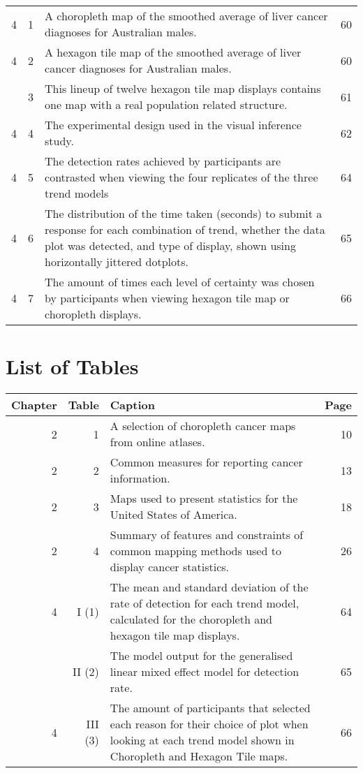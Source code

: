 \documentclass{monashthesis}
\begin{document}
\begin{tabular}{rr>{\raggedright\arraybackslash}p{20em}r}
4 & 1 & A choropleth map of the smoothed average of liver cancer diagnoses for Australian males. & 60\\
4 & 2 & A hexagon tile map of the smoothed average of liver cancer diagnoses for Australian males. & 60\\
\addlinespace
4 & 3 & This lineup of twelve hexagon tile map displays contains one map with a real population related structure. & 61\\
4 & 4 & The experimental design used in the visual inference study. & 62\\
4 & 5 & The detection rates achieved by participants are contrasted when viewing the four replicates of the three trend models & 64\\
4 & 6 & The distribution of the time taken (seconds) to submit a response for each combination of trend, whether the data plot was detected, and type of display, shown using horizontally jittered dotplots. & 65\\
4 & 7 & The amount of times each level of certainty was chosen by participants when viewing hexagon tile map or choropleth displays. & 66\\
\bottomrule
\end{tabular}

\hypertarget{list-of-tables}{%
\chapter*{List of Tables}\label{list-of-tables}}

\begin{tabular}{rr>{\raggedright\arraybackslash}p{20em}r}
\toprule
Chapter & Table & Caption & Page\\
\midrule
2 & 1 & A selection of choropleth cancer maps from online atlases. & 10\\
2 & 2 & Common measures for reporting cancer information. & 13\\
2 & 3 & Maps used to present statistics for the United States of America. & 18\\
2 & 4 & Summary of features and constraints of common mapping methods used to display
cancer statistics. & 26\\
4 & I (1) & The mean and standard deviation of the rate of detection for each trend model, calculated for the choropleth and hexagon tile map displays. & 64\\
\addlinespace
4 & II (2) & The model output for the generalised linear mixed effect model for detection rate. & 65\\
4 & III (3) & The amount of participants that selected each reason for their choice of plot when looking at each trend model shown in Choropleth and Hexagon Tile maps. & 66\\
\bottomrule
\end{tabular}
\end{document}
